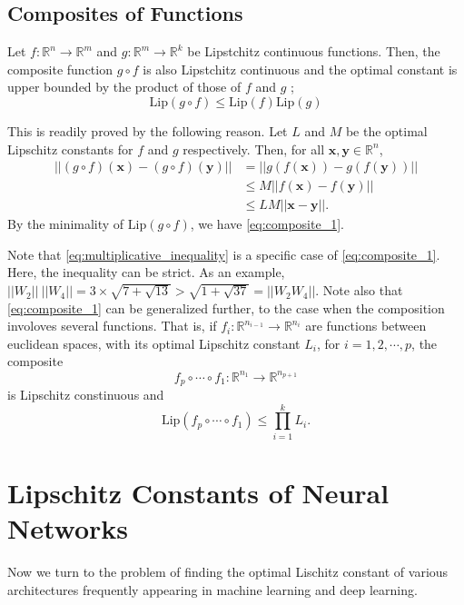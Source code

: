 \documentclass[12pt]{report}
\numberwithin{figure}{chapter}
\theoremstyle{plain}
\theoremstyle{definition}
\theoremstyle{corollary}
\theoremstyle{definition}
\theoremstyle{plain}
\theoremstyle{definition}
\theoremstyle{plain}
\newcommand\bx{\ensuremath{\boldsymbol x}}
\newcommand\by{\ensuremath{\boldsymbol y}}
\newcommand\lip{\ensuremath{\text{Lip}}}
\begin{document}
\section{Composites of Functions}
Let \(f:\mathbb R^n\to\mathbb R^m\) and \(g:\mathbb R^m\to\mathbb R^k\) be Lipstchitz continuous functions.
Then, the composite function \(g\circ f\) is also Lipstchitz continuous and the optimal constant is upper bounded by the product of those of \(f\) and \(g\) ; 
\begin{equation}\label{eq:composite_1}
\lip(g\circ f)\le\lip(f)\lip(g)
\end{equation}

This is readily proved by the following reason.
Let \(L\) and \(M\) be the optimal Lipschitz constants for \(f\) and \(g\) respectively.
Then, for all \(\bx,\by\in\mathbb R^n\),
\begin{align*}
||(g\circ f)(\bx)-(g\circ f)(\by)||
&=||g(f(\bx))-g(f(\by))||\\
&\le M||f(\bx)-f(\by)||\\
&\le LM||\bx-\by||.
\end{align*}
By the minimality of \(\lip(g\circ f)\), we have \eqref{eq:composite_1}.

Note that \eqref{eq:multiplicative_inequality} is a specific case of \eqref{eq:composite_1}.
Here, the inequality can be strict.
As an example, \(||W_2||\:||W_4||=3\times\sqrt{7+\sqrt{13}}>\sqrt{1+\sqrt{37}}=||W_2W_4||\).
Note also that \eqref{eq:composite_1} can be generalized further, to the case when the composition involoves several functions.
That is, if \(f_i:\mathbb R^{n_{i-1}}\to\mathbb R^{n_i}\) are  functions between euclidean spaces, with its optimal Lipschitz constant \(L_i\), for \(i=1,2,\cdots,p\), the composite
\[f_p\circ\cdots\circ f_1:\mathbb R^{n_1}\to\mathbb R^{n_{p+1}}\]
is Lipschitz constinuous and
\begin{equation}\label{eq:composite_2}
\lip(f_p\circ\cdots\circ f_1)\le\prod_{i=1}^kL_i.
\end{equation}

\chapter{Lipschitz Constants of Neural Networks}

Now we turn to the problem of finding the optimal Lischitz constant of various architectures frequently appearing in machine learning and deep learning.
\end{document}
